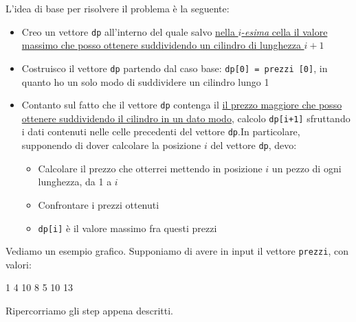 L'idea di base per risolvere il problema è la seguente:
\begin{itemize}
	\item Creo un vettore \verb|dp| all'interno del quale salvo \underline{nella $ i $-\textit{esima} cella il valore massimo che posso ottenere suddividendo un cilindro di lunghezza $ i+1 $}
	\item Costruisco il vettore \verb|dp| partendo dal caso base: \verb|dp[0] = prezzi [0]|, in quanto ho un solo modo di suddividere un cilindro lungo 1
	\item Contanto sul fatto che il vettore \verb|dp| contenga il \underline{il prezzo maggiore che posso ottenere suddividendo il cilindro in un dato modo}, calcolo \verb|dp[i+1]| sfruttando i dati contenuti nelle celle precedenti del vettore \verb|dp|.In particolare, supponendo di dover calcolare la posizione $ i $ del vettore \verb|dp|, devo:
	      \begin{itemize}
		      \item Calcolare il prezzo che otterrei mettendo in posizione $ i $ un pezzo di ogni lunghezza, da 1 a $ i $
		      \item Confrontare i prezzi ottenuti
		      \item \verb|dp[i]| è il valore massimo fra questi prezzi
	      \end{itemize}
\end{itemize}
Vediamo un esempio grafico. Supponiamo di avere in input il vettore \verb|prezzi|, con valori:
\begin{center}
	1 4 10 8 5 10 13
\end{center}
Ripercorriamo gli step appena descritti.

